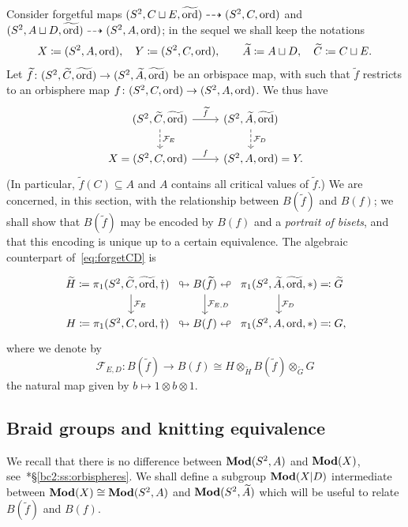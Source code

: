 \documentclass{amsart}
\newcommand\Forget{{\mathcal F}}
\newcommand\wtf{{\widetilde f}}
\newcommand\wtA{{\widetilde A}}
\newcommand\wtC{{\widetilde C}}
\newcommand\wtG{{\widetilde G}}
\newcommand\wtH{{\widetilde H}}
\newcommand\wtord{{\widetilde\ord}}
\begin{document}
Consider forgetful maps
$(S^2,C\sqcup E,\wtord)\dashrightarrow(S^2,C,\ord)$ and
$(S^2,A\sqcup D,\wtord)\dashrightarrow(S^2,A,\ord)$; in the
sequel we shall keep the notations
\[X\coloneqq(S^2,A,\ord),\quad Y\coloneqq(S^2,C,\ord),\qquad
  \wtA\coloneqq A\sqcup D,\quad\wtC\coloneqq C\sqcup E.
\]
Let $\wtf\colon(S^2,\wtC,\wtord)\to(S^2,\wtA,\wtord)$
be an orbispace map, with such that $\wtf$ restricts to an orbisphere
map $f\colon(S^2,C,\operatorname{ord})\to(S^2,A,\operatorname{ord})$. We thus have
\begin{equation}\label{eq:forgetCD}
  \begin{tikzcd}
    (S^2,\wtC,\wtord)\ar[r,"\wtf"]\ar[d,dashed,"\Forget_E"] & (S^2,\wtA,\wtord)\ar[d,dashed,"\Forget_D"]\\
    \makebox[0pt][r]{$X={}$}(S^2,C,\ord)\ar[r,"f"] & (S^2,A,\ord)\makebox[0pt][l]{${}=Y.$}
  \end{tikzcd}
\end{equation}
(In particular, $\wtf(C)\subseteq A$ and $A$ contains all
critical values of $\wtf$.) We are concerned, in this section,
with the relationship between $B(\wtf)$ and $B(f)$; we shall
show that $B(\wtf)$ may be encoded by $B(f)$ and a
\emph{portrait of bisets}, and that this encoding is unique up to a
certain equivalence. The algebraic counterpart of~\eqref{eq:forgetCD} is
\begin{equation}\label{eq:forgetCD2}
  \begin{tikzcd}[column sep=0mm]
    \makebox[0pt][r]{$\wtH\coloneqq{}$}\pi_1(S^2,\wtC,\wtord,\dagger)\ar[d,"\Forget_E"] & \looparrowright B(\wtf)\looparrowleft\ar[d,"\Forget_{E,D}"] &\pi_1(S^2,\wtA,\wtord,*)\ar[d,"\Forget_D"]\makebox[0pt][l]{${}\eqqcolon\wtG$}\\
    \makebox[0pt][r]{$H\coloneqq{}$}\pi_1(S^2,C,\ord,\dagger) &\looparrowright B(f) \looparrowleft &\pi_1(S^2,A,\ord,*)\makebox[0pt][l]{${}\eqqcolon G,$}
  \end{tikzcd}
\end{equation}
where we denote by
\begin{equation}\label{eq:forgetbi}
  \Forget_{E,D}\colon B(\wtf)\to B(f)\cong H\otimes_\wtH B(\wtf)\otimes_\wtG G
\end{equation}
the natural map given by $b\mapsto1\otimes b\otimes1$.

\subsection{Braid groups and knitting equivalence}
\label{ss:BrGr KnEq}
We recall that there is no difference between $\mathbf{\relax Mod}(S^2,A)$ and
$\mathbf{\relax Mod}(X)$,
see~\cite{bartholdi-dudko:bc2}*{\S\ref{bc2:ss:orbispheres}}. We shall
define a subgroup $\mathbf{\relax Mod}(X|D)$ intermediate between
$\mathbf{\relax Mod}(X)\cong\mathbf{\relax Mod}(S^2,A)$ and $\Mod(S^2,\wtA)$ which will be
useful to relate $B(\wtf)$ and $B(f)$.
\end{document}
